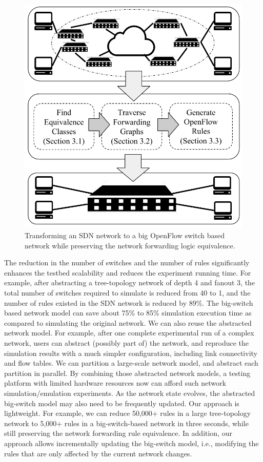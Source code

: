 \begin{figure}[t]
\centering
\includegraphics[scale=.6]{figures/BigSimOverview.pdf}
\caption{Transforming an SDN network to a big OpenFlow switch based network while preserving the network forwarding logic equivalence.}
\label{Fig:BigSimOverview}
\end{figure}

The reduction in the number of switches and the number of rules significantly enhances the testbed scalability and reduces the experiment running time.
For example, after abstracting a tree-topology network of depth 4 and fanout 3,
the total number of switches required to simulate is reduced from 40 to 1, and the number of rules existed in the SDN network is reduced by 89\%.
The big-switch based network model can save about
75\% to 85\% simulation execution time as compared to simulating the original network.
We can also reuse the abstracted network model.
For example, after one complete experimental run of a complex network,
users can abstract (possibly part of) the network, and reproduce the simulation results with
a much simpler configuration, including link connectivity and flow tables.
We can partition a large-scale network model, and abstract each partition in parallel.
By combining those abstracted network models, a testing platform with limited hardware resources
now can afford such network simulation/emulation experiments.
As the network state evolves, the abstracted big-switch model may also need to be frequently updated.
Our approach is lightweight. For example, we can reduce 50,000+ rules in a large tree-topology network
to 5,000+ rules in a big-switch-based network in three seconds, 
while still preserving the network forwarding rule equivalence.
In addition, our approach allows incrementally updating the big-switch model,
i.e., modifying the rules that are only affected by the current network changes.

